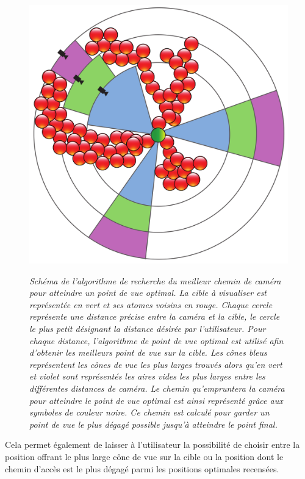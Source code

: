 \begin{figure}[h]
  \centering
  {\includegraphics[width=.5\linewidth]{./figures/ch3/optimal_pov_camera_path}}
    \caption[Schéma de l'algorithme de recherche du meilleur chemin de caméra pour atteindre un point de vue optimal.]{{\it Schéma de l'algorithme de recherche du meilleur chemin de caméra pour atteindre un point de vue optimal. La cible à visualiser est représentée en vert et ses atomes voisins en rouge. Chaque cercle représente une distance précise entre la caméra et la cible, le cercle le plus petit désignant la distance désirée par l'utilisateur. Pour chaque distance, l'algorithme de point de vue optimal est utilisé afin d'obtenir les meilleurs point de vue sur la cible. Les cônes bleus représentent les cônes de vue les plus larges trouvés alors qu'en vert et violet sont représentés les aires vides les plus larges entre les différentes distances de caméra. Le chemin qu'empruntera la caméra pour atteindre le point de vue optimal est ainsi représenté grâce aux symboles de couleur noire. Ce chemin est calculé pour garder un point de vue le plus dégagé possible jusqu'à atteindre le point final.}}
  \label{Fig:optimal_pov_camera_path}
  \hspace{0.2cm}
\end{figure}

Cela permet également de laisser à l'utilisateur la possibilité de choisir entre la position offrant le plus large cône de vue sur la cible ou la position dont le chemin d'accès est le plus dégagé parmi les positions optimales recensées. %

